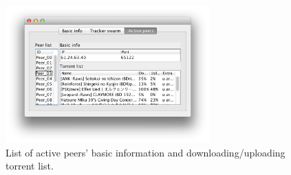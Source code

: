 \documentclass[twoside,a4paper,10pt]{article}
\begin{document}
\begin{figure}[!htp]
  \centering
  \includegraphics[width=0.7\textwidth]{imgs/tracker/activePeers.png}
  \caption{\label{fig:trackerPeersInfo}List of active peers' basic information and downloading/uploading torrent list.}
\end{figure}

\FloatBarrier



\end{document}
